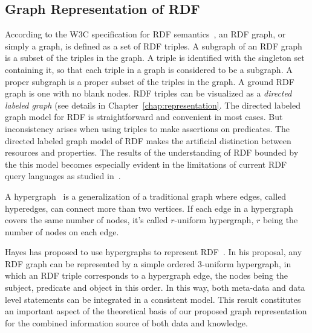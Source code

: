 \subsection{Graph Representation of RDF}
\label{sec:rdfgraph}
According to the W3C specification for RDF semantics~\cite{Hayes_rdf2004}, an RDF graph, or simply a graph, is defined as a set of RDF triples. A subgraph of an RDF graph is a subset of the triples in the graph. A triple is identified with the singleton set containing it, so that each triple in a graph is considered to be a subgraph. A proper subgraph is a proper subset of the triples in the graph. A ground RDF graph is one with no blank nodes. RDF triples can be visualized as a \emph{directed labeled graph} (see details in Chapter~\ref{chap:representation}. The directed labeled graph model for RDF is straightforward and convenient in most cases. But inconsistency arises when using triples to make assertions on predicates. The directed labeled graph model of RDF makes the artificial distinction between resources and properties. The results of the understanding of RDF bounded by the this model becomes especially evident in the limitations of current RDF query languages as studied in~\cite{Angles04rdfquery}.


A hypergraph~\cite{Hypergraph} is a generalization of a traditional graph where edges, called hyperedges, can connect more than two vertices. If each edge in a hypergraph covers the same number of nodes, it's called $r$-uniform hypergraph, $r$ being the number of nodes on each edge.

Hayes has proposed to use hypergraphs to represent RDF~\cite{GraphModelRDF}. In his proposal, any RDF graph can be represented by a simple ordered 3-uniform hypergraph, in which an RDF triple corresponds to a hypergraph edge, the nodes being the subject, predicate and object in this order. In this way, both meta-data and data level statements can be integrated in a consistent model.
This result constitutes an important aspect of the theoretical basis of our proposed graph representation for the combined information source of both data and knowledge.

